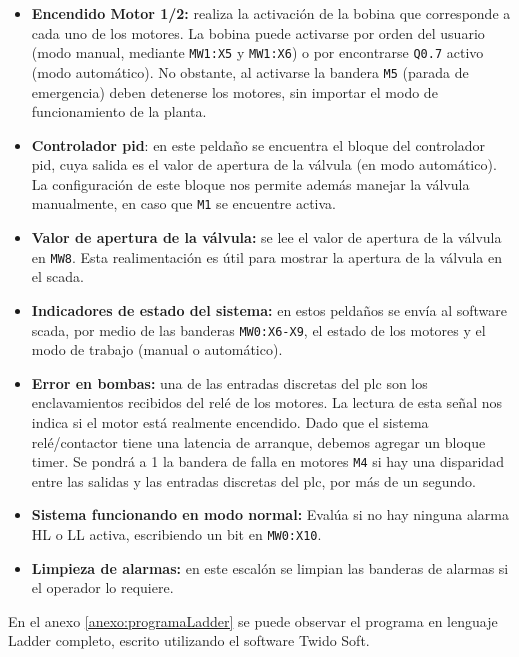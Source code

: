 \begin{itemize}
  \item \textbf{Encendido Motor 1/2:}
  realiza la activación de la bobina que corresponde a cada uno de los motores.
  La bobina puede activarse por orden del usuario (modo manual, mediante
\verb|MW1:X5| y \verb|MW1:X6|) o por
encontrarse \verb|Q0.7| activo (modo automático).
 No obstante, al activarse la bandera \verb|M5| (parada de emergencia) deben
detenerse
 los motores, sin importar el modo de funcionamiento de la planta.

  \item \textbf{Controlador \gls{pid}}: en este peldaño se encuentra el bloque
del controlador \gls{pid}, cuya salida es el valor de apertura de la
válvula (en modo automático).
  La configuración de este bloque nos permite además manejar la válvula
manualmente, en caso que \verb|M1| se encuentre activa.

  \item \textbf{Valor de apertura de la válvula:} se lee el valor de apertura de
la válvula en \verb|MW8|. Esta realimentación es útil para mostrar
la apertura de la válvula en el \gls{scada}.

  \item \textbf{Indicadores de estado del sistema:} en estos peldaños se envía
al software \gls{scada}, por medio de las banderas \verb|MW0:X6-X9|,
  el estado de los motores y el modo de trabajo (manual o automático).

  \item \textbf{Error en bombas:} una de las entradas discretas del \gls{plc}
son los enclavamientos recibidos del relé de los motores. La lectura de esta
señal nos indica si el motor está realmente encendido.
  Dado que el sistema relé/contactor tiene una latencia de arranque, debemos
agregar un bloque timer.
Se pondrá a 1 la bandera de falla en motores \verb|M4| si hay
una disparidad entre las
salidas y las entradas discretas del \gls{plc}, por más de un segundo.

  \item \textbf{Sistema funcionando en modo normal:}
  Evalúa si no hay ninguna alarma HL o LL activa, escribiendo un bit en
\verb|MW0:X10|.

  \item \textbf{Limpieza de alarmas:} en este escalón se limpian las banderas
de alarmas si el operador lo requiere.
\end{itemize}

En el anexo \ref{anexo:programaLadder} se puede
observar el programa en
lenguaje Ladder completo, escrito utilizando el software Twido Soft.

